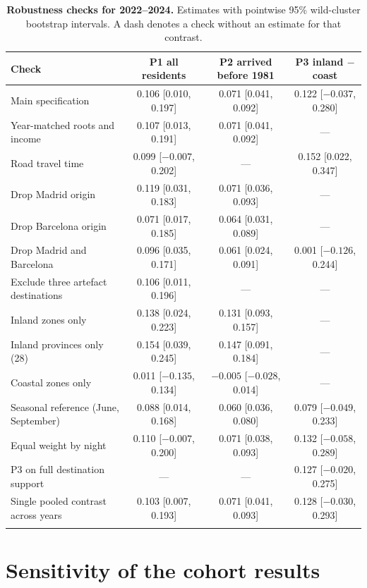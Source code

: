 \documentclass[pdflatex,sn-mathphys-num]{sn-jnl}
\begin{document}
\begin{table}[!htbp]
\caption{\textbf{Robustness checks for 2022--2024.} Estimates with pointwise 95\% wild-cluster bootstrap intervals. A dash denotes a check without an estimate for that contrast.}\label{tab:robust}
\footnotesize
\begin{tabular*}{\textwidth}{@{\extracolsep\fill}lccc}
\toprule
Check & P1 all residents & P2 arrived before 1981 & P3 inland $-$ coast \\
\midrule
Main specification & 0.106 [0.010, 0.197] & 0.071 [0.041, 0.092] & 0.122 [$-0.037$, 0.280] \\
Year-matched roots and income & 0.107 [0.013, 0.191] & 0.071 [0.041, 0.092] & --- \\
Road travel time & 0.099 [$-0.007$, 0.202] & --- & 0.152 [0.022, 0.347] \\
Drop Madrid origin & 0.119 [0.031, 0.183] & 0.071 [0.036, 0.093] & --- \\
Drop Barcelona origin & 0.071 [0.017, 0.185] & 0.064 [0.031, 0.089] & --- \\
Drop Madrid and Barcelona & 0.096 [0.035, 0.171] & 0.061 [0.024, 0.091] & 0.001 [$-0.126$, 0.244] \\
Exclude three artefact destinations & 0.106 [0.011, 0.196] & --- & --- \\
Inland zones only & 0.138 [0.024, 0.223] & 0.131 [0.093, 0.157] & --- \\
Inland provinces only (28) & 0.154 [0.039, 0.245] & 0.147 [0.091, 0.184] & --- \\
Coastal zones only & 0.011 [$-0.135$, 0.134] & $-0.005$ [$-0.028$, 0.014] & --- \\
Seasonal reference (June, September) & 0.088 [0.014, 0.168] & 0.060 [0.036, 0.080] & 0.079 [$-0.049$, 0.233] \\
Equal weight by night & 0.110 [$-0.007$, 0.200] & 0.071 [0.038, 0.093] & 0.132 [$-0.058$, 0.289] \\
P3 on full destination support & --- & --- & 0.127 [$-0.020$, 0.275] \\
Single pooled contrast across years & 0.103 [0.007, 0.193] & 0.071 [0.041, 0.093] & 0.128 [$-0.030$, 0.293] \\
\botrule
\end{tabular*}
\end{table}

\FloatBarrier
\section{Sensitivity of the cohort results}\label{si:cohort}
\end{document}
